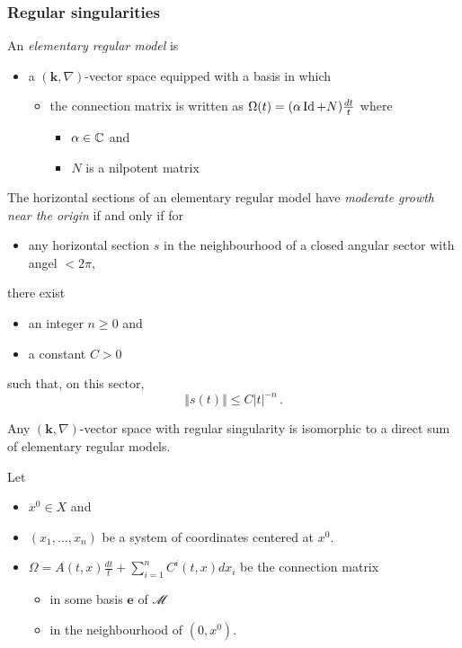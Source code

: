 \subsubsection{Regular singularities}
\begin{defn}
  An \emph{elementary regular model} is
  \begin{itemize}
    \item a $(\textbf{k},\nabla)$-vector space
      equipped with a basis in which
      \begin{itemize}
        \item the connection matrix is written as
          $\Omega(t)=(\alpha\operatorname{Id}+N)\frac{dt}{t}$
          where
          \begin{itemize}
            \item $\alpha\in\mathbb{C}$ and
            \item $N$ is a nilpotent matrix
          \end{itemize}
      \end{itemize}
  \end{itemize}
\end{defn}
\begin{defn}
  The horizontal sections of an elementary regular model have \emph{moderate
  growth near the origin} if and only if for
  \begin{itemize}
    \item any horizontal section $s$ in the neighbourhood of a closed angular
      sector with angel $<2\pi$,
  \end{itemize}
  there exist
  \begin{itemize}
    \item an integer $n\geq0$ and
    \item a constant $C>0$
  \end{itemize}
  such that, on this sector,
  \[
    \left\Vert s(t)\right\Vert\leq C|t|^{-n} \,.
  \]
\end{defn}
\begin{cor}[II.2.9]
  Any $(\textbf{k},\nabla)$-vector space with regular singularity is isomorphic
  to a direct sum of elementary regular models.
\end{cor}
Let
\begin{itemize}
  \item $x^0\in X$ and
  \item $(x_1,\dots,x_n)$ be a system of coordinates centered at $x^0$.
  \item $\Omega=A(t,x)\frac{dt}{t}+\sum_{i=1}^nC^{i}(t,x)dx_i$ be the
    connection matrix
    \begin{itemize}
      \item in some basis $\textbf{e}$ of $\mathscr{M}$
      \item in the neighbourhood of $(0,x^0)$.
    \end{itemize}
\end{itemize}
